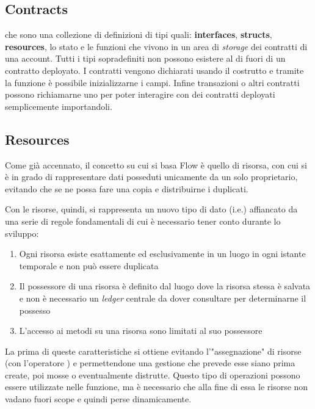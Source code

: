 \subsection*{Contracts}
che sono una collezione di definizioni di tipi quali: \textbf{interfaces}, \textbf{structs}, \textbf{resources}, lo stato e le funzioni che vivono in un area di \textit{storage} dei contratti di una account. Tutti i tipi sopradefiniti non possono esistere al di fuori di un contratto deployato. I contratti vengono dichiarati usando il costrutto  e tramite la funzione  è possibile inizializzarne i campi. Infine  transazioni o altri contratti possono richiamarne uno per poter interagire con dei contratti deployati semplicemente importandoli.

\subsection{Resources}\label{sez:resources}
Come già accennato, il concetto su cui si basa Flow è quello di risorsa, con cui si è in grado di rappresentare dati posseduti unicamente da un solo proprietario, evitando che se ne possa fare una copia e distribuirne i duplicati. 

Con le risorse, quindi, si rappresenta un nuovo tipo di dato (i.e.) affiancato da una serie di regole fondamentali di cui è necessario tener conto durante lo sviluppo:

\begin{enumerate}
    \item Ogni risorsa esiste esattamente ed esclusivamente in un luogo in ogni istante temporale e non può essere duplicata
    \item Il possessore di una risorsa è definito dal luogo dove la risorsa stessa è salvata e non è necessario un \textit{ledger} centrale da dover consultare per determinarne il possesso
    \item L'accesso ai metodi su una risorsa sono limitati al suo possessore
\end{enumerate}

La prima di queste caratteristiche si ottiene evitando l'"assegnazione" di risorse (con l'operatore \codeinline{=}) e permettendone una gestione che prevede esse siano prima create, poi mosse o eventualmente distrutte. Questo tipo di operazioni possono essere utilizzate nelle funzione, ma è necessario che alla fine di essa le risorse non vadano fuori scope e quindi perse dinamicamente.

